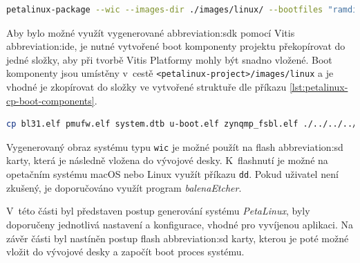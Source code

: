 \documentclass[a4paper, twoside, 11pt]{article}
\begin{document}
\begin{lstlisting}[language={sh}, caption={Příkaz pro vytvoření obrazu systému, který bude vvyužit v~procesu flash SD Card (vybalování obrazu systému na SD kartu).}, label= {lst:petalinux-package-wic}, morekeywords={petalinux-build, petalinux-package, petalinux-config}]
petalinux-package --wic --images-dir ./images/linux/ --bootfiles "ramdisk.cpio.gz.u-boot,boot.scr,Image,system.dtb,system-zynqmp-sck-kr-g-revB.dtb" --disk-name "sda"\end{lstlisting}

	Aby bylo možné využít vygenerované \gls{abbreviation:sdk} pomocí Vitis \gls{abbreviation:ide}, je nutné vytvořené boot komponenty projektu překopírovat do jedné složky, aby při tvorbě Vitis Platformy mohly být snadno vložené. Boot komponenty jsou umístěny v~cestě \texttt{<petalinux-project>/images/linux} a je vhodné je zkopírovat do složky ve vytvořené struktuře dle příkazu \ref{lst:petalinux-cp-boot-components}.\par

	\begin{lstlisting}[language={sh}, caption={Příkaz pro kopírování boot komponent do složky dané strukturou projektu.}, label={lst:petalinux-cp-boot-components}, morekeywords={cp}]
cp bl31.elf pmufw.elf system.dtb u-boot.elf zynqmp_fsbl.elf ./../../../linux-files/pfm/boot/\end{lstlisting}

		Vygenerovaný obraz systému typu \texttt{wic} je možné použít na flash \gls{abbreviation:sd} karty, která je následně vložena do vývojové desky. K~flashnutí je možné na opetačním systému macOS nebo Linux využít příkazu \texttt{dd}. Pokud uživatel není zkušený, je doporučováno využít program \textit{balenaEtcher}.\par
		V~této části byl představen postup generování systému \textit{PetaLinux}, byly doporučeny jednotlivá nastavení a konfigurace, vhodné pro vyvíjenou aplikaci. Na závěr části byl nastíněn postup flash \gls{abbreviation:sd} karty, kterou je poté možné vložit do vývojové desky a započít boot proces systému.
\end{document}
